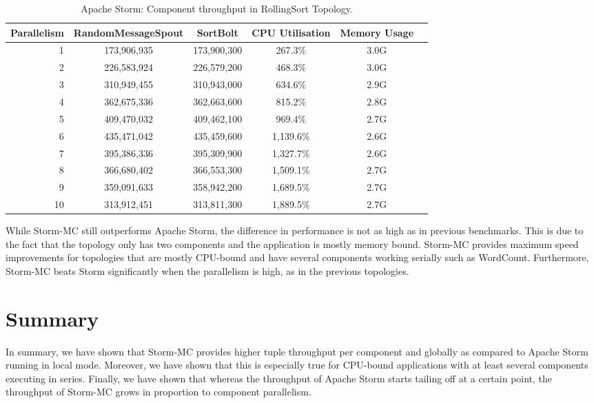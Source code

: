 \documentclass[bsc,twoside,singlespacing,normalheadings,parskip]{infthesis}\usepackage[]{graphicx}\usepackage[]{color}
\begin{document}
\begin{table}[!htb]
\begin{adjustwidth}{-0.5in}{-0.5in}
\centering
\small
\begin{tabular}{@{}rccccl@{}}
    \textbf{Parallelism} & \textbf{RandomMessageSpout} & \textbf{SortBolt} & \textbf{CPU Utilisation} & \textbf{Memory Usage} \\ \toprule
    1 & {173,906,935} & {173,900,300} & {267.3\%} & {3.0G} \\
    2 & {226,583,924} & {226,579,200} & {468.3\%} & {3.0G} \\
    3 & {310,949,455} & {310,943,000} & {634.6\%} & {2.9G} \\
    4 & {362,675,336} & {362,663,600} & {815.2\%} & {2.8G} \\
    5 & {409,470,032} & {409,462,100} & {969.4\%} & {2.7G} \\
    6 & {435,471,042} & {435,459,600} & {1,139.6\%} & {2.6G} \\
    7 & {395,386,336} & {395,309,900} & {1,327.7\%} & {2.6G} \\
    8 & {366,680,402} & {366,553,300} & {1,509.1\%} & {2.7G} \\
    9 & {359,091,633} & {358,942,200} & {1,689.5\%} & {2.7G} \\
    10 & {313,912,451} & {313,811,300} & {1,889.5\%} & {2.7G} \\
\end{tabular}
\caption{Apache Storm: Component throughput in RollingSort Topology.}
\label{table:storm_rolling}
\end{adjustwidth}
\end{table}

While Storm-MC still outperforms Apache Storm, the difference in performance is not as high as in previous benchmarks. This is due to the fact that the topology only has two components and the application is mostly memory bound. Storm-MC provides maximum speed improvements for topologies that are mostly CPU-bound and have several components working serially such as WordCount. Furthermore, Storm-MC beats Storm significantly when the parallelism is high, as in the previous topologies.

\section{Summary}

In summary, we have shown that Storm-MC provides higher tuple throughput per component and globally as compared to Apache Storm running in local mode. Moreover, we have shown that this is especially true for CPU-bound applications with at least several components executing in series. Finally, we have shown that whereas the throughput of Apache Storm starts tailing off at a certain point, the throughput of Storm-MC grows in proportion to component parallelism.
\end{document}
